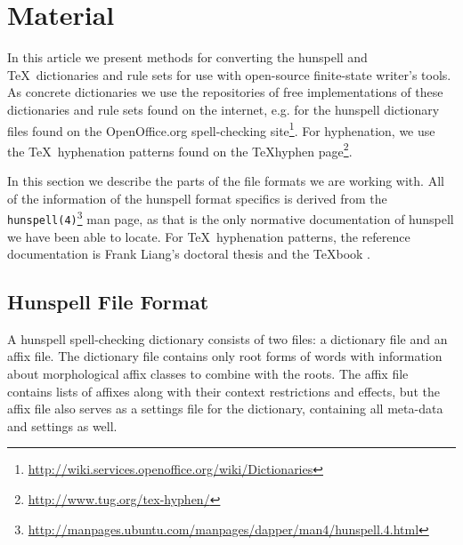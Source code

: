 \documentclass[postprint]{flammie}
\begin{document}
\section{Material}
\label{sec:material}

In this article we present methods for converting the hunspell and
\TeX\ dictionaries and rule sets for use with open-source finite-state
writer's tools.  As concrete dictionaries we use the repositories of
free implementations of these dictionaries and rule sets found on the
internet, e.g. for the hunspell dictionary files found on the
OpenOffice.org spell-checking
site\footnote{\url{http://wiki.services.openoffice.org/wiki/Dictionaries}}.
For hyphenation, we use the \TeX\ hyphenation patterns found on the
\TeX hyphen page\footnote{\url{http://www.tug.org/tex-hyphen/}}.

In this section we describe the parts of the file formats we are
working with. All of the information of the hunspell format specifics
is derived from the
\texttt{hunspell(4)}\footnote{\url{http://manpages.ubuntu.com/manpages/dapper/man4/hunspell.4.html}}
man page, as that is the only normative documentation of hunspell we
have been able to locate. For \TeX\ hyphenation patterns, the
reference documentation is Frank Liang's doctoral thesis
\cite{liang/1983} and the \TeX book \cite{knuth/1986}.

\subsection{Hunspell File Format}
\label{subsec:material-hunspell}

A hunspell spell-checking dictionary consists of two files: a
dictionary file and an affix file. The dictionary file contains only
root forms of words with information about morphological affix classes
to combine with the roots.  The affix file contains lists of affixes
along with their context restrictions and effects, but the affix file
also serves as a settings file for the dictionary, containing all
meta-data and settings as well.
\end{document}
